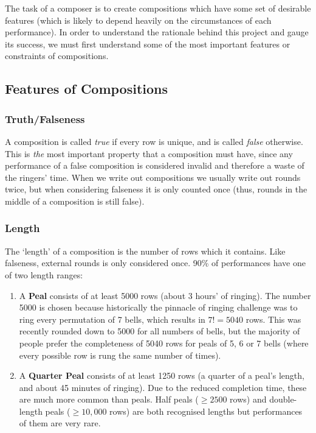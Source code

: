 \documentclass[12pt]{article}
\begin{document}
The task of a composer is to create compositions which have some set of desirable features (which is
likely to depend heavily on the circumstances of each performance).  In order to understand the
rationale behind this project and gauge its success, we must first understand some of the most
important features or constraints of compositions.

\subsection{Features of Compositions}

\subsubsection{Truth/Falseness}

A composition is called \emph{true} if every row is unique, and is called \emph{false} otherwise.
This is \emph{the} most important property that a composition must have, since any performance of a
false composition is considered invalid and therefore a waste of the ringers' time.  When we write
out compositions we usually write out rounds twice, but when considering falseness it is only
counted once (thus, rounds in the middle of a composition is still false).

\subsubsection{Length}

The `length' of a composition is the number of rows which it contains.  Like falseness, external
rounds is only considered once.  90\% of performances have one of two length ranges:

\begin{enumerate}
    \item A \textbf{Peal} consists of at least 5000 rows (about 3 hours' of ringing).
        The number 5000 is chosen because historically the pinnacle of ringing challenge was to ring
        every permutation of 7 bells, which results in $7! = 5040$ rows.  This was recently rounded
        down to 5000 for all numbers of bells, but the majority of people prefer the completeness of
        5040 rows for peals of 5, 6 or 7 bells (where every possible row is rung the same number of
        times).
    \item A \textbf{Quarter Peal} consists of at least 1250 rows (a quarter of a peal's length, and
        about 45 minutes of ringing).  Due to the reduced completion time, these are much more
        common than peals.  Half peals ($\ge 2500$ rows) and double-length peals ($\ge 10,000$ rows)
        are both recognised lengths but performances of them are very rare.
\end{enumerate}
\end{document}
